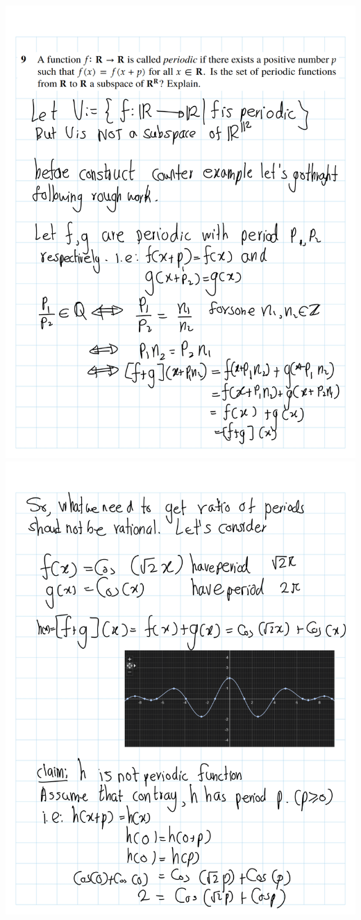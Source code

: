 \documentclass[
]{book}
\theoremstyle{definition}
\theoremstyle{definition}
\theoremstyle{definition}
\theoremstyle{definition}
\theoremstyle{remark}
\begin{document}
\begin{enumerate}
  \includegraphics{fig/Ex1C/Ex/Ex-06.png} \includegraphics{fig/Ex1C/Ex/Ex-07.png}

\end{enumerate}
\end{document}
